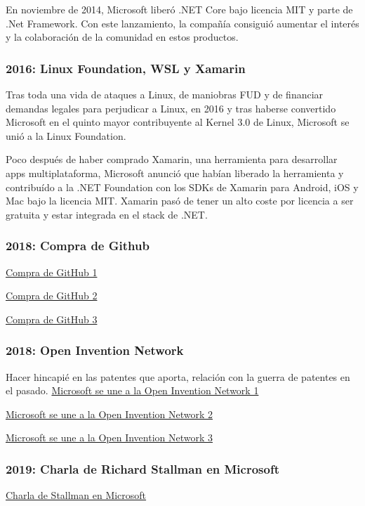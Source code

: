 En noviembre de 2014, Microsoft liberó .NET Core bajo licencia MIT y parte de .Net Framework. Con este lanzamiento, la compañía consiguió aumentar el interés y la colaboración de la comunidad en estos productos.\cite{arstechnica_2014:microsoft_open_sources_.NET}

\subsubsection{2016: Linux Foundation, WSL y Xamarin}
Tras toda una vida de ataques a Linux, de maniobras FUD y de financiar demandas legales para perjudicar a Linux, en 2016 y tras haberse convertido Microsoft en el quinto mayor contribuyente al Kernel 3.0 de Linux\cite{zdnet_2016:microsoft_contributes_linux}, Microsoft se unió a la Linux Foundation.\cite{arstechnica_2016:microsoft_joins_linux_foundation}

Poco después de haber comprado Xamarin, una herramienta para desarrollar apps multiplataforma, Microsoft anunció que habían liberado la herramienta y contribuído a la .NET Foundation con los SDKs de Xamarin para Android, iOS y Mac bajo la licencia MIT. Xamarin pasó de tener un alto coste por licencia a ser gratuita y estar integrada en el stack de .NET. \cite{genbeta_2016:microsoft_xamarin} \cite{petri_2016:microsoft_xamarin}

\subsubsection{2018: Compra de Github}
\href{https://www.xataka.com/aplicaciones/oficial-microsoft-compra-github-7-500-millones-dolares}{Compra de GitHub 1}

\href{https://www.elconfidencial.com/tecnologia/2018-06-04/microsoft-ahora-ama-el-software-libre-compra-la-startup-github-por-7-500-millones_1573704/}{Compra de GitHub 2}

\href{https://www.xataka.com/aplicaciones/microsoft-punto-adquirir-github-desarrolladores-desarrolladores-desarrolladores}{Compra de GitHub 3}

\subsubsection{2018: Open Invention Network}
Hacer hincapié en las patentes que aporta, relación con la guerra de patentes en el pasado.
\href{https://azure.microsoft.com/en-us/blog/microsoft-joins-open-invention-network-to-help-protect-linux-and-open-source/}{Microsoft se une a la Open Invention Network 1}

\href{https://www.zdnet.com/article/what-does-microsoft-joining-the-open-invention-network-mean-for-you/}{Microsoft se une a la Open Invention Network 2}

\href{https://www.muycomputerpro.com/2018/10/10/microsoft-se-une-a-open-invention-network}{Microsoft se une a la Open Invention Network 3}

\subsubsection{2019: Charla de Richard Stallman en Microsoft}
\href{https://stallman.org/articles/microsoft-talk.html}{Charla de Stallman en Microsoft}

